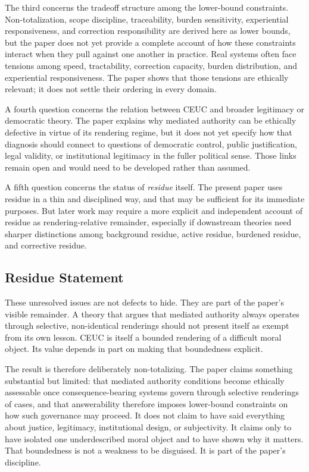 \documentclass[11pt]{article}
\renewcommand{\emph}[1]{\textit{#1}}
\begin{document}
The third concerns the tradeoff structure among the lower-bound constraints. Non-totalization, scope discipline, traceability, burden sensitivity, experiential responsiveness, and correction responsibility are derived here as lower bounds, but the paper does not yet provide a complete account of how these constraints interact when they pull against one another in practice. Real systems often face tensions among speed, tractability, correction capacity, burden distribution, and experiential responsiveness. The paper shows that those tensions are ethically relevant; it does not settle their ordering in every domain.

A fourth question concerns the relation between CEUC and broader legitimacy or democratic theory. The paper explains why mediated authority can be ethically defective in virtue of its rendering regime, but it does not yet specify how that diagnosis should connect to questions of democratic control, public justification, legal validity, or institutional legitimacy in the fuller political sense. Those links remain open and would need to be developed rather than assumed.

A fifth question concerns the status of \emph{residue} itself. The present paper uses residue in a thin and disciplined way, and that may be sufficient for its immediate purposes. But later work may require a more explicit and independent account of residue as rendering-relative remainder, especially if downstream theories need sharper distinctions among background residue, active residue, burdened residue, and corrective residue.

\subsection{Residue Statement}

These unresolved issues are not defects to hide. They are part of the paper's visible remainder. A theory that argues that mediated authority always operates through selective, non-identical renderings should not present itself as exempt from its own lesson. CEUC is itself a bounded rendering of a difficult moral object. Its value depends in part on making that boundedness explicit.

The result is therefore deliberately non-totalizing. The paper claims something substantial but limited: that mediated authority conditions become ethically assessable once consequence-bearing systems govern through selective renderings of cases, and that answerability therefore imposes lower-bound constraints on how such governance may proceed. It does not claim to have said everything about justice, legitimacy, institutional design, or subjectivity. It claims only to have isolated one underdescribed moral object and to have shown why it matters. That boundedness is not a weakness to be disguised. It is part of the paper's discipline.
\end{document}
